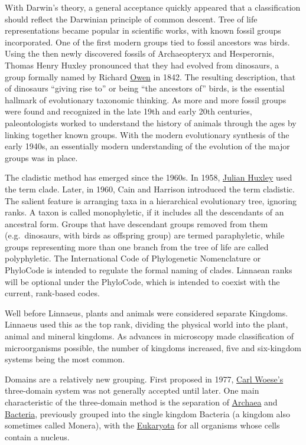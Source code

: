With Darwin's theory, a general acceptance quickly appeared that a
classification should reflect the Darwinian principle of common descent.
Tree of life representations became popular in scientific works, with
known fossil groups incorporated. One of the first modern groups tied to
fossil ancestors was birds. Using the then newly discovered fossils of
Archaeopteryx and Hesperornis, Thomas Henry Huxley pronounced that they
had evolved from dinosaurs, a group formally named by Richard \href{https://en.wikipedia.org/wiki/Richard_Owen}{Owen} in
1842. The resulting description, that of dinosaurs ``giving rise to'' or
being ``the ancestors of'' birds, is the essential hallmark of
evolutionary taxonomic thinking. As more and more fossil groups were
found and recognized in the late 19th and early 20th centuries,
paleontologists worked to understand the history of animals through the
ages by linking together known groups. With the modern evolutionary
synthesis of the early 1940s, an essentially modern understanding of the
evolution of the major groups was in place.

The cladistic method has emerged since the 1960s. In 1958, \href{https://en.wikipedia.org/wiki/Julian_Huxley}{Julian Huxley}
used the term clade. Later, in 1960, Cain and Harrison introduced the
term cladistic. The salient feature is arranging taxa in a hierarchical
evolutionary tree, ignoring ranks. A taxon is called monophyletic, if it
includes all the descendants of an ancestral form. Groups that have
descendant groups removed from them (e.g.~dinosaurs, with birds as
offspring group) are termed paraphyletic, while groups representing more
than one branch from the tree of life are called polyphyletic. The
International Code of Phylogenetic Nomenclature or PhyloCode is intended
to regulate the formal naming of clades. Linnaean ranks will be optional
under the PhyloCode, which is intended to coexist with the current,
rank-based codes.

Well before Linnaeus, plants and animals were considered separate
Kingdoms. Linnaeus used this as the top rank, dividing the physical
world into the plant, animal and mineral kingdoms. As advances in
microscopy made classification of microorganisms possible, the number of
kingdoms increased, five and six-kingdom systems being the most common.

Domains are a relatively new grouping. First proposed in 1977,
\href{https://en.wikipedia.org/wiki/Carl_Woese}{Carl Woese's}
three-domain system was not generally accepted until later. One main
characteristic of the three-domain method is the separation of \href{https://en.wikipedia.org/wiki/Archaea}{Archaea}
and \href{https://en.wikipedia.org/wiki/Bacteria}{Bacteria}, previously grouped into the single kingdom Bacteria (a
kingdom also sometimes called Monera), with the \href{https://en.wikipedia.org/wiki/Eukaryote}{Eukaryota} for all
organisms whose cells contain a nucleus.

